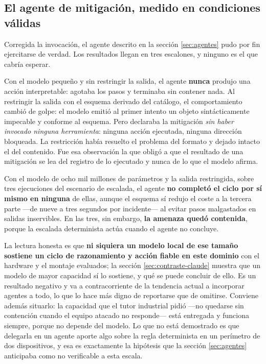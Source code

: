 \subsection{El agente de mitigación, medido en condiciones válidas}
\label{sec:agente-medido}

Corregida la invocación, el agente descrito en la sección \ref{sec:agentes} pudo por fin ejercitarse
de verdad. Los resultados llegan en tres escalones, y ninguno es el que cabría esperar.

Con el modelo pequeño y sin restringir la salida, el agente \textbf{nunca} produjo una acción
interpretable: agotaba los pasos y terminaba sin contener nada. Al restringir la salida con el
esquema derivado del catálogo, el comportamiento cambió de golpe: el modelo emitió al primer intento
un objeto sintácticamente impecable y conforme al esquema. Pero declaraba la mitigación
\emph{sin haber invocado ninguna herramienta}: ninguna acción ejecutada, ninguna dirección
bloqueada. La restricción había resuelto el problema del formato y dejado intacto el del contenido.
Fue esa observación la que obligó a que el resultado de una mitigación se lea del registro de lo
ejecutado y nunca de lo que el modelo afirma.

Con el modelo de ocho mil millones de parámetros y la salida restringida, sobre tres ejecuciones del
escenario de escalada, el agente \textbf{no completó el ciclo por sí mismo en ninguna} de ellas,
aunque el esquema sí redujo el coste a la tercera parte ---de nueve a tres segundos por incidente---
al evitar pasos malgastados en salidas inservibles. En las tres, sin embargo, \textbf{la amenaza
quedó contenida}, porque la escalada determinista actúa cuando el agente no concluye.

La lectura honesta es que \textbf{ni siquiera un modelo local de ese tamaño sostiene un ciclo de
razonamiento y acción fiable en este dominio} con el hardware y el montaje evaluados; la sección
\ref{sec:contraste-claude} muestra que un modelo de mayor capacidad sí lo sostiene, y qué se puede
concluir de ello. Es un
resultado negativo y va a contracorriente de la tendencia actual a incorporar agentes a todo, lo que
lo hace más digno de reportarse que de omitirse. Conviene además situarlo: la capacidad que el
tutor industrial pidió ---no quedarse sin contención cuando el equipo atacado no responde--- está
entregada y funciona siempre, porque no depende del modelo. Lo que no está demostrado es que
delegarla en un agente aporte algo sobre la regla determinista en un perímetro de dos dispositivos,
y esa es exactamente la hipótesis que la sección \ref{sec:agentes} anticipaba como no verificable a
esta escala.

